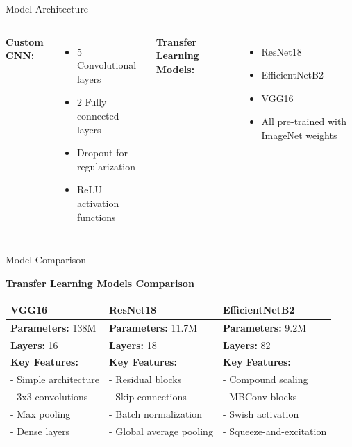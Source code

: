 \documentclass{beamer}
\begin{document}
\begin{frame}{Model Architecture}
    \begin{columns}[T]
        \textbf{\textcolor{maincolor}{Custom CNN:}}
        \begin{itemize}
            \item 5 Convolutional layers
            \item 2 Fully connected layers
            \item Dropout for regularization
            \item ReLU activation functions
        \end{itemize}
        
        \textbf{\textcolor{maincolor}{Transfer Learning Models:}}
        \begin{itemize}
            \item ResNet18
            \item EfficientNetB2
            \item VGG16
            \item All pre-trained with ImageNet weights
        \end{itemize}
    \end{columns}
\end{frame}
\begin{frame}{Model Comparison}
    \begin{center}
        \textbf{\textcolor{maincolor}{Transfer Learning Models Comparison}}
    \end{center}
    \vspace{0.3cm}
    \begin{table}
        \small
        \begin{tabular}{|p{}|p{}|p{}|}
            \hline
            \textbf{\textcolor{maincolor}{VGG16}} & \textbf{\textcolor{maincolor}{ResNet18}} & \textbf{\textcolor{maincolor}{EfficientNetB2}} \\
            \hline
            \textbf{Parameters:} 138M & \textbf{Parameters:} 11.7M & \textbf{Parameters:} 9.2M \\
            \hline
            \textbf{Layers:} 16 & \textbf{Layers:} 18 & \textbf{Layers:} 82 \\
            \hline
            \textbf{Key Features:} & \textbf{Key Features:} & \textbf{Key Features:} \\
            - Simple architecture & - Residual blocks & - Compound scaling \\
            - 3x3 convolutions & - Skip connections & - MBConv blocks \\
            - Max pooling & - Batch normalization & - Swish activation  \\
            - Dense layers & - Global average pooling & - Squeeze-and-excitation\\
            \hline
        \end{tabular}
    \end{table}
\end{frame}
\end{document}
